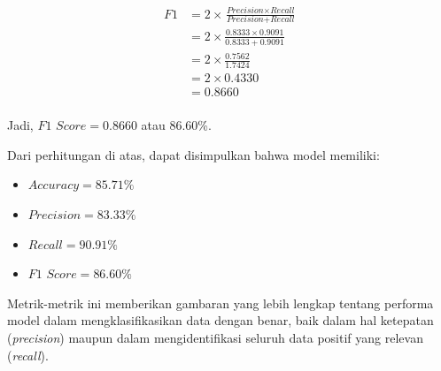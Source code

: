 \begin{align*}
    \textit{F1} &= 2 \times \frac{\textit{Precision} \times \textit{Recall}}{\textit{Precision} + \textit{Recall}} \\
    &= 2 \times \frac{0.8333 \times 0.9091}{0.8333 + 0.9091} \\
    &= 2 \times \frac{0.7562}{1.7424} \\
    &= 2 \times 0.4330 \\
    &= 0.8660\\
\end{align*}

Jadi, \(\textit{F1 Score} = 0.8660\) atau 86.60\%.

\medskip
Dari perhitungan di atas, dapat disimpulkan bahwa model memiliki:
\begin{itemize}
    \item \(\textit{Accuracy} = 85.71\%\)
    \item \(\textit{Precision} = 83.33\%\)
    \item \(\textit{Recall} = 90.91\%\)
    \item \(\textit{F1 Score} = 86.60\%\)
\end{itemize}
Metrik-metrik ini memberikan gambaran yang lebih lengkap tentang performa model dalam mengklasifikasikan data dengan benar, baik dalam hal ketepatan (\textit{precision}) maupun dalam mengidentifikasi seluruh data positif yang relevan (\textit{recall}).

